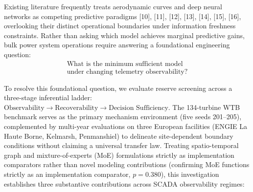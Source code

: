 \documentclass[
  journal]{IEEEtran}
\begin{document}
Existing literature frequently treats aerodynamic curves and deep neural
networks as competing predictive paradigms {[}10{]}, {[}11{]}, {[}12{]},
{[}13{]}, {[}14{]}, {[}15{]}, {[}16{]}, overlooking their distinct
operational boundaries under information freshness constraints. Rather
than asking which model achieves marginal predictive gains, bulk power
system operations require answering a foundational engineering question:
\begin{equation}
\boxed{
\begin{gathered}
\text{What is the minimum sufficient model} \\
\text{under changing telemetry observability?}
\end{gathered}
}
\label{eq:core-question}
\end{equation}

To resolve this foundational question, we evaluate reserve screening
across a three-stage inferential ladder:
\(\text{Observability} \to \text{Recoverability} \to \text{Decision Sufficiency}\).
The 134-turbine WTB benchmark serves as the primary mechanism
environment (five seeds 201--205), complemented by multi-year
evaluations on three European facilities (ENGIE La Haute Borne,
Kelmarsh, Penmanshiel) to delineate site-dependent boundary conditions
without claiming a universal transfer law. Treating spatio-temporal
graph and mixture-of-experts (MoE) formulations strictly as
implementation comparators rather than novel modeling contributions
(confirming MoE functions strictly as an implementation comparator,
\(p=0.380\)), this investigation establishes three substantive
contributions across SCADA observability regimes:
\end{document}
